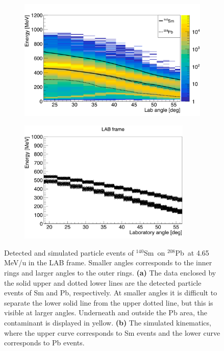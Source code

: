 \documentclass[twoside,english]{uiofysmaster/uiofysmaster}
\newcommand{\Sm}{$^{140}$Sm} %
\newcommand{\Pb}{$^{208}$Pb}
\begin{document}
\begin{figure}[htb]
	\centering
	\begin{subfigure}[b]{0.49\textwidth}
		\centering
		\includegraphics[width=\textwidth]{../Plots/plotting/particle-events-wcut.png}
		\caption{}
		\label{fig:part_wcut}
	\end{subfigure}
	\hfill 
	\begin{subfigure}[b]{0.49\textwidth}
		\centering
    		\includegraphics[width=0.90\textwidth]{../Plots/simulation/kin_140Sm_208Pb.png}
		\caption{}
		\label{fig:kinsim}
	\end{subfigure}
	\caption{Detected and simulated particle events of \Sm\ on \Pb\ at 4.65 MeV/u in the LAB frame. Smaller angles corresponds to the inner rings and larger angles to the outer rings.
	\textbf{(a)} The data enclosed by the solid upper and dotted lower lines are the detected particle events of Sm and Pb, respectively. 
	At smaller angles it is difficult to separate the lower solid line from the upper dotted line, but this is visible at larger angles.
	Underneath and outside the Pb area, the contaminant is displayed in yellow.
	\textbf{(b)} The simulated kinematics, where the upper curve corresponds to Sm events and the lower curve corresponds to Pb events.
	}
	\label{fig:part_events}
\end{figure}
\end{document}
